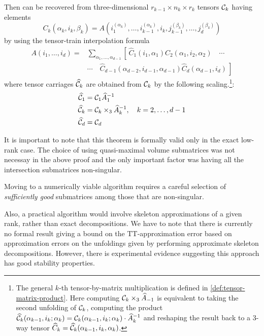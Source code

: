 \begin{Teo}
  Then \A can be recovered from three-dimensional $r_{k-1} \times n_k \times r_k$ tensors $\mathcal{C}_k$ having elements
  \begin{equation*}
    C_k(\alpha_k,i_k,\beta_k) = A(i_1^{(\alpha_k)},\ldots,i_{k-1}^{(\alpha_k)},i_k,j_{k-1}^{(\beta_k)},\ldots,j_d^{(\beta_k)})
  \end{equation*}
  by using the tensor-train interpolation formula
  \begin{align}
    A(i_1,\ldots,i_d) =& \sum_{\alpha_1,\ldots,\alpha_{d-1}} \left[ \, \hat{C}_1(i_1,\alpha_1) \hat{C}_2(\alpha_1,i_2,\alpha_2) \quad \cdots \right. \nonumber \\
    &\cdots \quad \left. \hat{C}_{d-1}(\alpha_{d-2},i_{d-1},\alpha_{d-1}) \hat{C}_d(\alpha_{d-1},i_d) \, \right]
  \end{align}
  where tensor carriages $\widehat{\mathcal{C}}_k$ are obtained from $\mathcal{C}_k$ by the following scaling.\footnote{The general $k$-th tensor-by-matrix multiplication is defined in \ref{def:tensor-matrix-product}. Here computing $\mathcal{C}_k \times_3 \widehat{A}_{-1}$ is equivalent to taking the second unfolding of $\mathcal{C}_k$, computing the product $\widehat{\mathcal{C}}_k(\alpha_{k-1},i_k;\alpha_k) = \mathcal{C}_k(\alpha_{k-1},i_k;\alpha_k) \cdot \widehat{A}_k^{-1}$ and reshaping the result back to a 3-way tensor $\widehat{C}_k = \widehat{\mathcal{C}}_k(\alpha_{k-1},i_k,\alpha_k)$.}:
  \begin{align}
    \widehat{\mathcal{C}}_1 &= \mathcal{C}_1 \widehat{A}_1^{-1} \nonumber \\
    \widehat{\mathcal{C}}_k &= \mathcal{C}_k \times_3 \widehat{A}_k^{-1}, \quad k = 2, \ldots, d-1 \\
    \widehat{\mathcal{C}}_d &= \mathcal{C}_d \nonumber
  \end{align}
\end{Teo}

It is important to note that this theorem is formally valid only in the exact low-rank case. The choice of using quasi-maximal volume submatrices was not necessay in the above proof and the only important factor was having all the intersection submatrices non-singular.

Moving to a numerically viable algorithm requires a careful selection of \emph{sufficiently good} submatrices among those that are non-singular.

Also, a practical algorithm would involve skeleton approximations of a given rank, rather than exact decompositions. We have to note that there is currently no formal result giving a bound on the TT-approximation error based on approximation errors on the unfoldings given by performing approximate skeleton decompositions. However, there is experimental evidence \cite{tt-cross} suggesting this approach has good stability properties.


